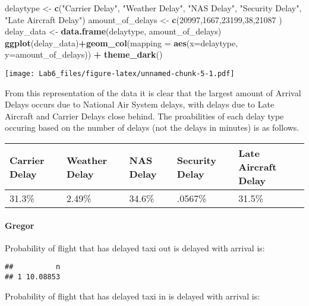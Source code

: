 \documentclass[]{article}
\newenvironment{Shaded}{\begin{snugshade}}{\end{snugshade}}
\newcommand{\KeywordTok}[1]{\textcolor[rgb]{0.13,0.29,0.53}{\textbf{#1}}}
\newcommand{\DataTypeTok}[1]{\textcolor[rgb]{0.13,0.29,0.53}{#1}}
\newcommand{\DecValTok}[1]{\textcolor[rgb]{0.00,0.00,0.81}{#1}}
\newcommand{\StringTok}[1]{\textcolor[rgb]{0.31,0.60,0.02}{#1}}
\newcommand{\OperatorTok}[1]{\textcolor[rgb]{0.81,0.36,0.00}{\textbf{#1}}}
\newcommand{\NormalTok}[1]{#1}
\let\oldparagraph\paragraph
\renewcommand{\paragraph}[1]{\oldparagraph{#1}\mbox{}}
\begin{document}
\begin{Shaded}
\begin{Highlighting}[]
\NormalTok{delaytype <-}\StringTok{ }\KeywordTok{c}\NormalTok{(}\StringTok{"Carrier Delay"}\NormalTok{, }\StringTok{"Weather Delay"}\NormalTok{, }\StringTok{"NAS Delay"}\NormalTok{, }\StringTok{"Security Delay"}\NormalTok{, }\StringTok{"Late Aircraft Delay"}\NormalTok{)}
\NormalTok{amount_of_delays <-}\StringTok{ }\KeywordTok{c}\NormalTok{(}\DecValTok{20997}\NormalTok{,}\DecValTok{1667}\NormalTok{,}\DecValTok{23199}\NormalTok{,}\DecValTok{38}\NormalTok{,}\DecValTok{21087}\NormalTok{ )}
\NormalTok{delay_data <-}\StringTok{ }\KeywordTok{data.frame}\NormalTok{(delaytype, amount_of_delays)}
\KeywordTok{ggplot}\NormalTok{(delay_data)}\OperatorTok{+}\KeywordTok{geom_col}\NormalTok{(}\DataTypeTok{mapping =} \KeywordTok{aes}\NormalTok{(}\DataTypeTok{x=}\NormalTok{delaytype, }\DataTypeTok{y=}\NormalTok{amount_of_delays)) }\OperatorTok{+}\StringTok{ }\KeywordTok{theme_dark}\NormalTok{()}
\end{Highlighting}
\end{Shaded}

\texttt{[image: Lab6\_files/figure-latex/unnamed-chunk-5-1.pdf]}

From this representation of the data it is clear that the largest amount
of Arrival Delays occurs due to National Air System delays, with delays
due to Late Aircraft and Carrier Delays close behind. The proabilities
of each delay type occuring based on the number of delays (not the
delays in minutes) is as follows.

\begin{longtable}[]{@{}lllll@{}}
\toprule
Carrier Delay & Weather Delay & NAS Delay & Security Delay & Late
Aircraft Delay\tabularnewline
\midrule
\endhead
31.3\% & 2.49\% & 34.6\% & .0567\% & 31.5\%\tabularnewline
\bottomrule
\end{longtable}

\paragraph{Gregor}\label{gregor}

Probability of flight that has delayed taxi out is delayed with arrival
is:

\begin{verbatim}
##          n
## 1 10.08853
\end{verbatim}

Probability of flight that has delayed taxi in is delayed with arrival
is:
\end{document}
